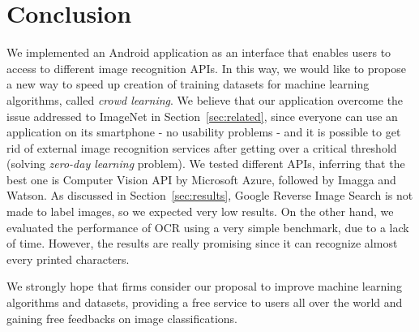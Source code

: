 \section{Conclusion}
\label{sec:conclusion}

We implemented an Android application as an interface that enables users to 
access to different image recognition APIs. In this way, we would like to 
propose a new way to speed up creation of training  datasets for machine 
learning algorithms, called \textit{crowd learning}. We believe that our 
application overcome the issue addressed to ImageNet in 
Section~\ref{sec:related}, since everyone can use an application on its 
smartphone - no usability problems - and it is possible to get rid of external 
image recognition services after getting over a critical threshold (solving 
\textit{zero-day learning} problem).
We tested different APIs, inferring that the best one is Computer Vision API by 
Microsoft Azure\cite{Microsoft}, followed by Imagga\cite{Imagga} and 
Watson\cite{IBM}. As discussed in Section~\ref{sec:results}, Google Reverse 
Image Search\cite{Google} is not made to label images, so we expected very low 
results. On the other hand, we evaluated the performance of OCR using a very simple 
benchmark, due to a lack of time. However, the results are really promising 
since it can recognize almost every printed characters.

We strongly hope that firms consider our proposal to improve machine learning 
algorithms and datasets, providing a free service to users all over the world 
and gaining free feedbacks on image classifications.